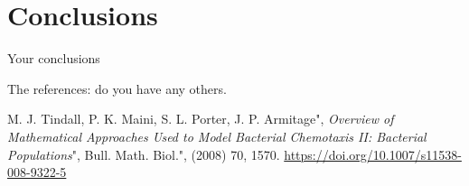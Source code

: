 \documentclass{mm2}
\begin{document}
\section{Conclusions}
Your conclusions

The references: do you have any others.

\begin{thebibliography}{99}

M. J. Tindall, P. K. Maini, S. L. Porter, J. P. Armitage",
{\it Overview of Mathematical Approaches Used to Model Bacterial Chemotaxis II: Bacterial Populations}", Bull. Math. Biol.", (2008) 70, 1570.
\url{https://doi.org/10.1007/s11538-008-9322-5}



\end{thebibliography}{}
\end{document}
